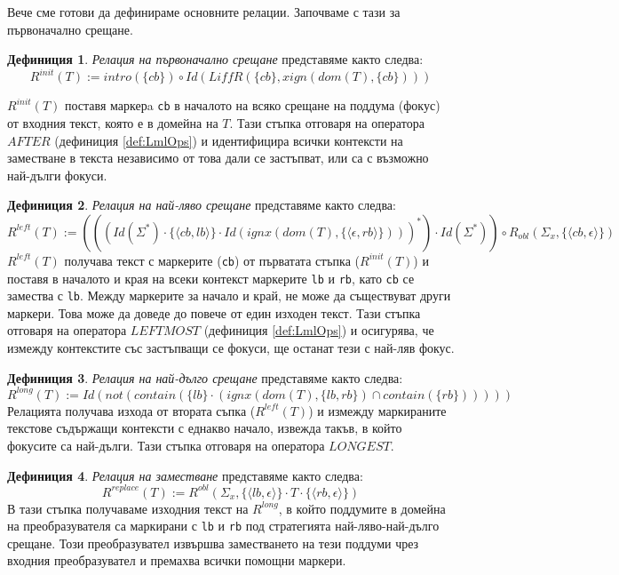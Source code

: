 \documentclass[12pt, oneside]{article}
\theoremstyle{definition}
\newtheorem{definition}{Дефиниция}[section]
\begin{document}
Вече сме готови да дефинираме основните релации. Започваме с тази за първоначално срещане.

\begin{definition}\label{def:Rinit} \emph{Релация на първоначално срещане} представяме както следва:
	\[ R^{init}(T) := intro(\{ cb \}) \circ Id(LiffR(\{ cb \}, xign(dom(T), \{ cb \}))) \]

	\( R^{init}(T) \) поставя маркерa \verb/cb/ в началото на всяко срещане на поддума (фокус) от входния текст, която е в домейна на \(T\). Тази стъпка отговаря на оператора \(AFTER\) (дефиниция \ref{def:LmlOps}) и идентифицира всички контексти на заместване в текста независимо от това дали се застъпват, или са с възможно най-дълги фокуси. 
\end{definition}

\begin{definition}\label{def:Rleft} \emph{Релация на най-ляво срещане} представяме както следва:
	\[ R^{left}(T) := (((Id(\Sigma^*) \cdot \{ \langle cb, lb \rangle \} \cdot Id(ignx(dom(T), \{ \langle \epsilon, rb \rangle \})))^*) \cdot Id(\Sigma^*)) \circ R_{obl} (\Sigma_x, \{ \langle cb, \epsilon \rangle \}) \]
	\(R^{left}(T)\) получава текст с маркерите (\verb/cb/) от първатата стъпка (\(R^{init}(T)\)) и поставя в началото и края на всеки контекст маркерите \verb/lb/ и \verb/rb/, като  \verb/cb/ се замества с \verb/lb/. Между маркерите за начало и край, не може да съществуват други маркери. Това може да доведе до повече от един изходен текст. Тази стъпка отговаря на оператора \(LEFTMOST\) (дефиниция \ref{def:LmlOps}) и осигурява, че измежду контекстите със застъпващи се фокуси, ще останат тези с най-ляв фокус.
\end{definition}

\begin{definition}\label{def:Rlong} \emph{Релация на най-дълго срещане} представяме както следва:
	\[ R^{long}(T) := Id(not(contain(\{lb\} \cdot (ignx(dom(T), \{lb, rb\}) \cap contain(\{rb\}))))) \]
	Релацията получава изхода от втората съпка (\(R^{left}(T)\)) и измежду маркираните текстове съдържащи контексти с еднакво начало, извежда такъв, в който фокусите са най-дълги. Тази стъпка отговаря на оператора \(LONGEST\).
\end{definition}

\begin{definition}\label{def:Rreplace} \emph{Релация на заместване} представяме както следва:
	\[ R^{replace}(T) := R^{obl}(\Sigma_x, \{ \langle lb, \epsilon \rangle \} \cdot T \cdot \{ \langle rb, \epsilon \rangle \}) \]
	В тази стъпка получаваме изходния текст на \(R^{long}\), в който поддумите в домейна на преобразувателя са маркирани с \verb/lb/ и \verb/rb/ под стратегията най-ляво-най-дълго срещане. Този преобразувател извършва заместването на тези поддуми чрез входния преобразувател и премахва всички помощни маркери.
\end{definition}
\end{document}
